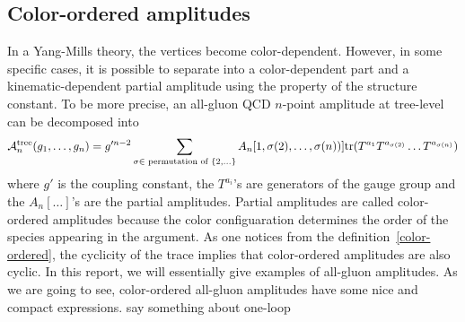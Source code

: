 \subsection*{Color-ordered amplitudes}
In a Yang-Mills theory, the vertices become color-dependent. 
However, in some specific cases, it is possible to separate into 
a color-dependent part and a kinematic-dependent partial amplitude using the property of the structure constant.
To be more precise, an all-gluon QCD $n$-point amplitude at tree-level can be decomposed into~\cite{MANGANO1988461}
\begin{equation}\label{color-ordered}
\mathcal{A}_n^{\mathrm{tree}}(g_1, \ldots, g_n) = g'^{n-2}\sum_{\sigma\in\textrm{ permutation of }\{2,\ldots\}} A_n[1,\sigma(2),\ldots,\sigma(n))]\mathrm{tr}(T^{a_1} T^{a_{\sigma(2)}}\ldots T^{a_{\sigma(n)}})
\end{equation}
where $g'$ is the coupling constant, the $T^{a_i}$'s are generators of the gauge group and the $A_n[\ldots]$'s are the partial amplitudes.
Partial amplitudes are called color-ordered amplitudes because the color configuaration determines the order of the species appearing in the argument.
As one notices from the definition~\cref{color-ordered}, the cyclicity of the trace implies that color-ordered amplitudes are also cyclic. 
In this report, we will essentially give examples of all-gluon amplitudes.
As we are going to see, color-ordered all-gluon amplitudes have some nice and compact expressions.
\color{red} say something about one-loop\color{black}
%
%
